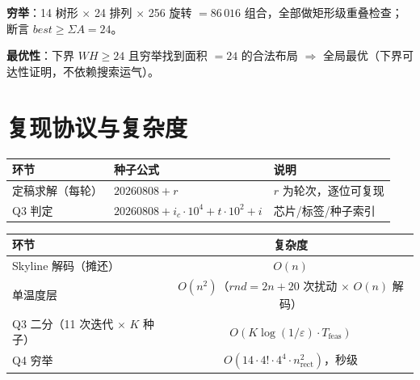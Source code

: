 \documentclass[12pt,a4paper]{article}
\begin{document}
\textbf{穷举}：14 树形 $\times$ 24 排列 $\times$ 256 旋转
$= 86\,016$ 组合，全部做矩形级重叠检查；断言 $best \ge \Sigma A = 24$。

\textbf{最优性}：下界 $WH \ge 24$ 且穷举找到面积 $=24$ 的合法布局
$\Rightarrow$ 全局最优（下界可达性证明，不依赖搜索运气）。

\section{复现协议与复杂度}

\begin{table}[H]
\centering
\small
\begin{tabular}{lll}
\toprule
环节 & 种子公式 & 说明 \\
\midrule
定稿求解（每轮） & $20260808 + r$ & $r$ 为轮次，逐位可复现 \\
Q3 判定 & $20260808 + i_c\cdot10^4 + t\cdot10^2 + i$ & 芯片/标签/种子索引 \\
\bottomrule
\end{tabular}
\end{table}

\begin{table}[H]
\centering
\small
\begin{tabular}{lc}
\toprule
环节 & 复杂度 \\
\midrule
Skyline 解码（摊还） & $O(n)$ \\
单温度层 & $O(n^2)$（$rnd = 2n+20$ 次扰动 $\times$ $O(n)$ 解码） \\
Q3 二分（11 次迭代 $\times$ $K$ 种子） & $O(K\log(1/\varepsilon)\cdot T_{\text{feas}})$ \\
Q4 穷举 & $O(14 \cdot 4! \cdot 4^4 \cdot n_{\text{rect}}^2)$，秒级 \\
\bottomrule
\end{tabular}
\end{table}
\end{document}
